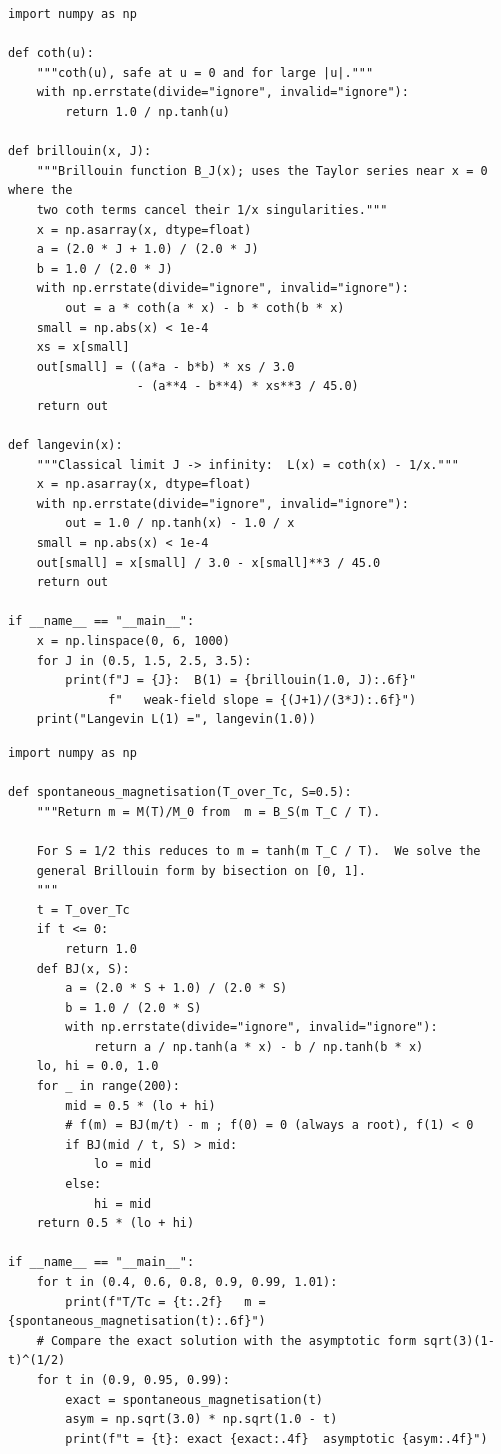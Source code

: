 \documentclass[11pt,a4paper]{article}
\begin{document}
\begin{lstlisting}[caption={Brillouin function, its weak-field limit and the Langevin limit.}]
import numpy as np

def coth(u):
    """coth(u), safe at u = 0 and for large |u|."""
    with np.errstate(divide="ignore", invalid="ignore"):
        return 1.0 / np.tanh(u)

def brillouin(x, J):
    """Brillouin function B_J(x); uses the Taylor series near x = 0 where the
    two coth terms cancel their 1/x singularities."""
    x = np.asarray(x, dtype=float)
    a = (2.0 * J + 1.0) / (2.0 * J)
    b = 1.0 / (2.0 * J)
    with np.errstate(divide="ignore", invalid="ignore"):
        out = a * coth(a * x) - b * coth(b * x)
    small = np.abs(x) < 1e-4
    xs = x[small]
    out[small] = ((a*a - b*b) * xs / 3.0
                  - (a**4 - b**4) * xs**3 / 45.0)
    return out

def langevin(x):
    """Classical limit J -> infinity:  L(x) = coth(x) - 1/x."""
    x = np.asarray(x, dtype=float)
    with np.errstate(divide="ignore", invalid="ignore"):
        out = 1.0 / np.tanh(x) - 1.0 / x
    small = np.abs(x) < 1e-4
    out[small] = x[small] / 3.0 - x[small]**3 / 45.0
    return out

if __name__ == "__main__":
    x = np.linspace(0, 6, 1000)
    for J in (0.5, 1.5, 2.5, 3.5):
        print(f"J = {J}:  B(1) = {brillouin(1.0, J):.6f}"
              f"   weak-field slope = {(J+1)/(3*J):.6f}")
    print("Langevin L(1) =", langevin(1.0))
\end{lstlisting}

\begin{lstlisting}[caption={Solving the mean-field self-consistency equation by bisection.}]
import numpy as np

def spontaneous_magnetisation(T_over_Tc, S=0.5):
    """Return m = M(T)/M_0 from  m = B_S(m T_C / T).

    For S = 1/2 this reduces to m = tanh(m T_C / T).  We solve the
    general Brillouin form by bisection on [0, 1].
    """
    t = T_over_Tc
    if t <= 0:
        return 1.0
    def BJ(x, S):
        a = (2.0 * S + 1.0) / (2.0 * S)
        b = 1.0 / (2.0 * S)
        with np.errstate(divide="ignore", invalid="ignore"):
            return a / np.tanh(a * x) - b / np.tanh(b * x)
    lo, hi = 0.0, 1.0
    for _ in range(200):
        mid = 0.5 * (lo + hi)
        # f(m) = BJ(m/t) - m ; f(0) = 0 (always a root), f(1) < 0
        if BJ(mid / t, S) > mid:
            lo = mid
        else:
            hi = mid
    return 0.5 * (lo + hi)

if __name__ == "__main__":
    for t in (0.4, 0.6, 0.8, 0.9, 0.99, 1.01):
        print(f"T/Tc = {t:.2f}   m = {spontaneous_magnetisation(t):.6f}")
    # Compare the exact solution with the asymptotic form sqrt(3)(1-t)^(1/2)
    for t in (0.9, 0.95, 0.99):
        exact = spontaneous_magnetisation(t)
        asym = np.sqrt(3.0) * np.sqrt(1.0 - t)
        print(f"t = {t}: exact {exact:.4f}  asymptotic {asym:.4f}")
\end{lstlisting}
\end{document}
